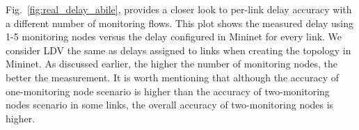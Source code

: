 \documentclass[10pt, journal, letterpaper]{IEEEtran}
\begin{document}
Fig.~\ref{fig:real_delay_abile}, provides a closer look to per-link delay accuracy with a different number of monitoring flows. This plot shows the measured delay using 1-5 monitoring nodes versus the delay configured in Mininet for every link. We consider LDV the same as delays assigned to links when creating the topology in Mininet.
As discussed earlier, the higher the number of monitoring nodes, the better the measurement. It is worth mentioning that although the accuracy of one-monitoring node scenario is higher than the accuracy of two-monitoring nodes scenario in some links, the overall accuracy of two-monitoring nodes is higher. 
\end{document}
